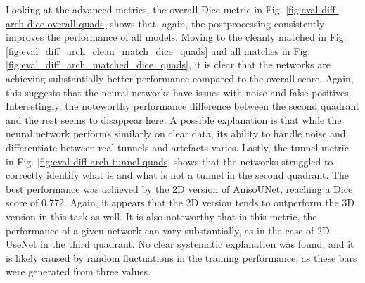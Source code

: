 \documentclass[
  digital,     %
  oneside,     %
  nosansbold,  %
  nocolorbold, %
  lof,         %
  lot,         %
]{fithesis4}
\begin{document}
Looking at the advanced metrics, the overall Dice metric in Fig. \ref{fig:eval-diff-arch-dice-overall-quads} shows that, again, the postprocessing consistently improves the performance of all models. Moving to the cleanly matched in Fig. \ref{fig:eval_diff_arch_clean_match_dice_quads} and all matches in Fig. \ref{fig:eval_diff_arch_matched_dice_quads}, it is clear that the networks are achieving substantially better performance compared to the overall score. Again, this suggests that the neural networks have issues with noise and false positives. Interestingly, the noteworthy performance difference between the second quadrant and the rest seems to disappear here. A possible explanation is that while the neural network performs similarly on clear data, its ability to handle noise and differentiate between real tunnels and artefacts varies. Lastly, the tunnel metric in Fig. \ref{fig:eval-diff-arch-tunnel-quads} shows that the networks struggled to correctly identify what is and what is not a tunnel in the second quadrant. The best performance was achieved by the 2D version of AnisoUNet, reaching a Dice score of $0.772$. Again, it appears that the 2D version tends to outperform the 3D version in this task as well. It is also noteworthy that in this metric, the performance of a given network can vary substantially, as in the case of 2D UseNet in the third quadrant. No clear systematic explanation was found, and it is likely caused by random fluctuations in the training performance, as these bars were generated from three values.
\end{document}
